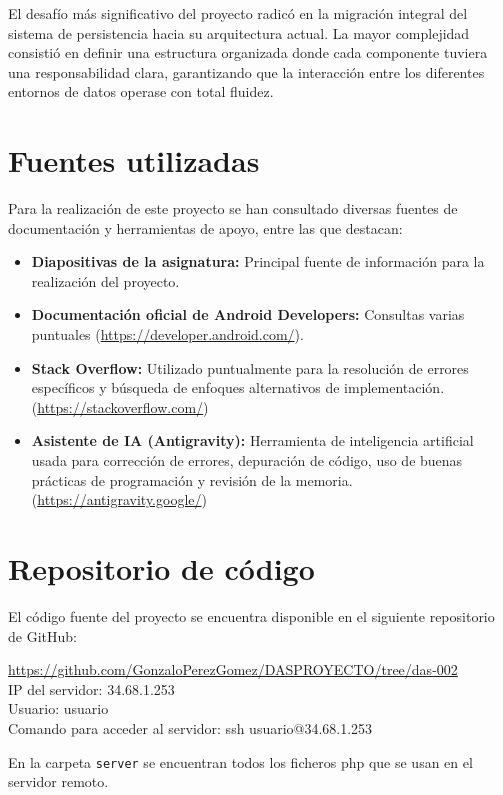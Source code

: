 \documentclass{article}
\begin{document}
El desafío más significativo del proyecto radicó en la migración integral del sistema de persistencia hacia su arquitectura actual. La mayor complejidad consistió en definir una estructura organizada donde cada componente tuviera una responsabilidad clara, garantizando que la interacción entre los diferentes entornos de datos operase con total fluidez.

\section{Fuentes utilizadas}

Para la realización de este proyecto se han consultado diversas fuentes de documentación y herramientas de apoyo, entre las que destacan:

\begin{itemize}
    \item \textbf{Diapositivas de la asignatura: } Principal fuente de información para la realización del proyecto.
    \item \textbf{Documentación oficial de Android Developers:} Consultas varias puntuales (\url{https://developer.android.com/}).
    \item \textbf{Stack Overflow:} Utilizado puntualmente para la resolución de errores específicos y búsqueda de enfoques alternativos de implementación. (\url{https://stackoverflow.com/})
    \item \textbf{Asistente de IA (Antigravity):} Herramienta de inteligencia artificial usada para corrección de errores, depuración de código, uso de buenas prácticas de programación y revisión de la memoria. (\url{https://antigravity.google/})
\end{itemize}

\section{Repositorio de código}

El código fuente del proyecto se encuentra disponible en el siguiente repositorio de GitHub:

\begin{center}
    \url{https://github.com/GonzaloPerezGomez/DASPROYECTO/tree/das-002}\\
    IP del servidor: 34.68.1.253 \\
    Usuario: usuario \\
    Comando para acceder al servidor: ssh usuario@34.68.1.253
\end{center}

En la carpeta \texttt{server} se encuentran todos los ficheros php que se usan en el servidor remoto.
\end{document}
